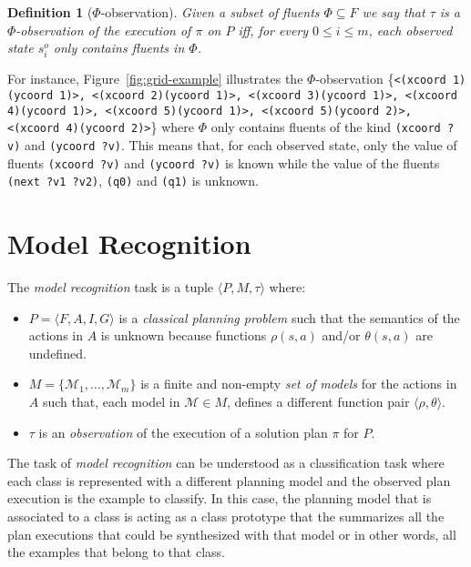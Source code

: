 \documentclass[letterpaper]{article} %
\newcommand{\tup}[1]{{\langle #1 \rangle}}
\newtheorem{definition}[theorem]{Definition}
\begin{document}
\begin{definition}[$\Phi$-observation]
Given a subset of fluents $\Phi\subseteq F$ we say that $\tau$ is a $\Phi$-observation of the execution of $\pi$ on $P$ iff, for every $0\leq i\leq m$, each observed state $s_i^o$ only contains fluents in $\Phi$.
\end{definition}

For instance, Figure~\ref{fig:grid-example} illustrates the $\Phi$-observation \{{\tt\scriptsize<(xcoord 1)(ycoord 1)>, <(xcoord 2)(ycoord 1)>, <(xcoord 3)(ycoord 1)>, <(xcoord 4)(ycoord 1)>, <(xcoord 5)(ycoord 1)>, <(xcoord 5)(ycoord 2)>, <(xcoord 4)(ycoord 2)>}\} where $\Phi$ only contains fluents of the kind {\tt\small (xcoord ?v)} and {\tt\small (ycoord ?v)}. This means that, for each observed state, only the value of fluents {\tt\small (xcoord ?v)} and {\tt\small (ycoord ?v)} is known while the value of the fluents {\tt\small (next ?v1 ?v2)}, {\tt\small (q0)} and {\tt\small (q1)} is unknown.



\section{Model Recognition}
\label{sec:recognition}
The {\em model recognition} task is a tuple $\tup{P,M,\tau}$ where:
\begin{itemize}
\item $P=\tup{F,A,I,G}$ is a {\em classical planning problem} such that the semantics of the actions in $A$ is unknown because functions $\rho(s,a)$ and/or $\theta(s,a)$ are undefined.
\item $M=\{\mathcal{M}_1,\ldots,\mathcal{M}_m\}$ is a finite and non-empty {\em set of models} for the actions in $A$ such that, each model in $\mathcal{M}\in M$, defines a different function pair $\tup{\rho,\theta}$.
\item $\tau$ is an {\em observation} of the execution of a solution plan $\pi$ for $P$.
\end{itemize}

The task of {\em model recognition} can be understood as a classification task where each class is represented with a different planning model and the observed plan execution is the example to classify. In this case, the planning model that is associated to a class is acting as a class prototype that the summarizes all the plan executions that could be synthesized with that model or in other words, all the examples that belong to that class.
\end{document}
